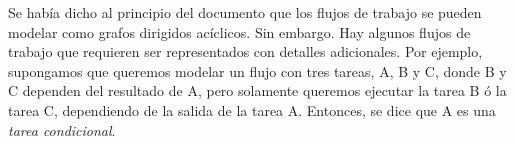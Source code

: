 \documentclass[letterpaper, 12pt]{report}
\begin{document}
                                                                                                                                                                                                                                                                                                                                                                                                                                                                                                                                                                                                                                                                                                                                                                                                                                                                                                                                                                                                                                                                                                                                                                                                                                                                                                                                                                                                                                                                                                                                                                                                                                                                                                                                                                                                                                                                                                                                                                                                                                                                                                                                                                                                                                                                                                                                                                                                   

Se había dicho al principio del documento que los flujos de trabajo se pueden modelar como grafos dirigidos acíclicos. Sin embargo. Hay algunos flujos de trabajo que requieren ser representados con detalles adicionales. Por ejemplo, supongamos que queremos modelar un flujo con tres tareas, A, B y C, donde B y C dependen del resultado de A, pero solamente queremos ejecutar la tarea B ó la tarea C, dependiendo de la salida de la tarea A. Entonces, se dice que A es una \emph{tarea condicional}.
\end{document}
